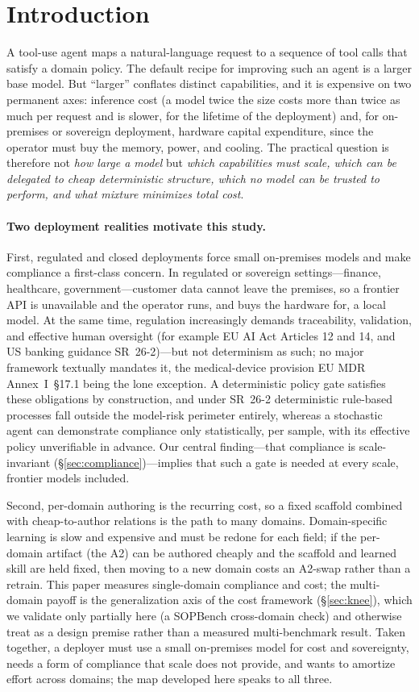 \documentclass[10pt]{article}
\begin{document}
\section{Introduction}
A tool-use agent maps a natural-language request to a sequence of tool calls that satisfy a domain policy. The default recipe for improving such an agent is a larger base model. But ``larger'' conflates distinct capabilities, and it is expensive on two permanent axes: inference cost (a model twice the size costs more than twice as much per request and is slower, for the lifetime of the deployment) and, for on-premises or sovereign deployment, hardware capital expenditure, since the operator must buy the memory, power, and cooling. The practical question is therefore not \emph{how large a model} but \emph{which capabilities must scale, which can be delegated to cheap deterministic structure, which no model can be trusted to perform, and what mixture minimizes total cost}.

\paragraph{Two deployment realities motivate this study.} First, regulated and closed deployments force small on-premises models and make compliance a first-class concern. In regulated or sovereign settings---finance, healthcare, government---customer data cannot leave the premises, so a frontier API is unavailable and the operator runs, and buys the hardware for, a local model. At the same time, regulation increasingly demands traceability, validation, and effective human oversight (for example EU AI Act Articles 12 and 14, and US banking guidance SR~26-2)---but not determinism as such; no major framework textually mandates it, the medical-device provision EU MDR Annex~I~\S17.1 being the lone exception. A deterministic policy gate satisfies these obligations by construction, and under SR~26-2 deterministic rule-based processes fall outside the model-risk perimeter entirely, whereas a stochastic agent can demonstrate compliance only statistically, per sample, with its effective policy unverifiable in advance. Our central finding---that compliance is scale-invariant (\S\ref{sec:compliance})---implies that such a gate is needed at every scale, frontier models included.

Second, per-domain authoring is the recurring cost, so a fixed scaffold combined with cheap-to-author relations is the path to many domains. Domain-specific learning is slow and expensive and must be redone for each field; if the per-domain artifact (the A2) can be authored cheaply and the scaffold and learned skill are held fixed, then moving to a new domain costs an A2-swap rather than a retrain. This paper measures single-domain compliance and cost; the multi-domain payoff is the generalization axis of the cost framework (\S\ref{sec:knee}), which we validate only partially here (a SOPBench cross-domain check) and otherwise treat as a design premise rather than a measured multi-benchmark result. Taken together, a deployer must use a small on-premises model for cost and sovereignty, needs a form of compliance that scale does not provide, and wants to amortize effort across domains; the map developed here speaks to all three.
\end{document}
